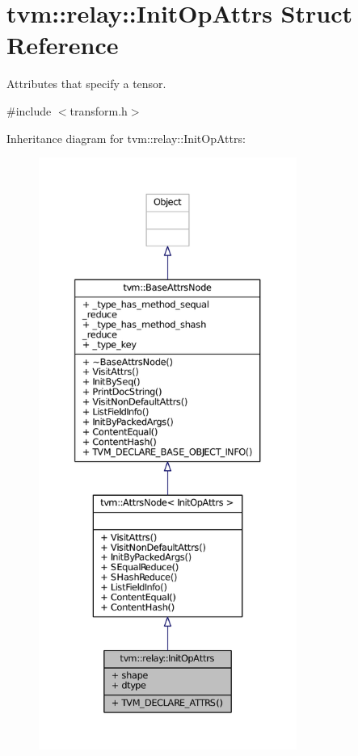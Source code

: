 \hypertarget{structtvm_1_1relay_1_1InitOpAttrs}{}\section{tvm\+:\+:relay\+:\+:Init\+Op\+Attrs Struct Reference}
\label{structtvm_1_1relay_1_1InitOpAttrs}


Attributes that specify a tensor.  




{\ttfamily \#include $<$transform.\+h$>$}



Inheritance diagram for tvm\+:\+:relay\+:\+:Init\+Op\+Attrs\+:
\nopagebreak
\begin{figure}[H]
\begin{center}
\leavevmode
\includegraphics[height=550pt]{structtvm_1_1relay_1_1InitOpAttrs__inherit__graph}
\end{center}
\end{figure}


